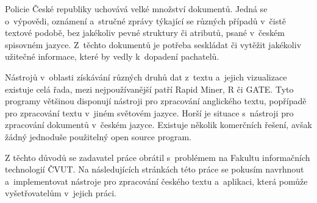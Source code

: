 \begin{introduction}
Policie České republiky uchovává velké množství dokumentů. Jedná se o~výpovědi, oznámení a~stručné zprávy týkající se různých případů v~čistě textové podobě, bez jakékoliv pevné struktury či atributů, psané v~českém spisovném jazyce. Z~těchto dokumentů je potřeba seskládat či vytěžit jakékoliv užitečné informace, které by vedly k~dopadení pachatelů.

Nástrojů v~oblasti získávání různých druhů dat z~textu a~jejich vizualizace existuje celá řada, mezi nejpoužívanější patří Rapid Miner, R či GATE. Tyto programy většinou disponují nástroji pro zpracování anglického textu, popřípadě pro zpracování textu v~jiném světovém jazyce. Horší je situace s~nástroji pro zpracování dokumentů v~českém jazyce. Existuje několik komerčních řešení, avšak žádný jednoduše použitelný open source program.

Z těchto důvodů se zadavatel práce obrátil s~problémem na Fakultu informačních technologií ČVUT. Na následujících stránkách této práce se pokusím navrhnout a~implementovat nástroje pro zpracování českého textu a~aplikaci, která pomůže vyšetřovatelům v~jejich práci.
\end{introduction}